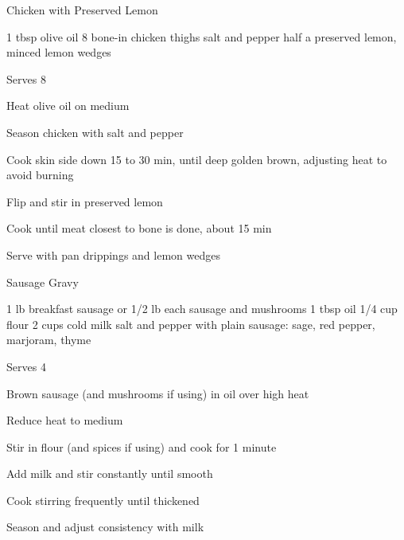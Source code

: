 
\begin{recipe}{Chicken with Preserved Lemon}{}
\begin{ingredients}
1 tbsp olive oil
8 bone-in chicken thighs
salt and pepper
half a preserved lemon, minced
lemon wedges
\end{ingredients}
\nextcolumn
Serves 8
\begin{steps}
    \item Heat olive oil on medium
    \item Season chicken with salt and pepper
    \item Cook skin side down 15 to 30 min, until deep golden brown, adjusting heat to avoid burning
    \item Flip and stir in preserved lemon
    \item Cook until meat closest to bone is done, about 15 min
    \item Serve with pan drippings and lemon wedges
\end{steps}
\end{recipe}

\begin{recipe}{Sausage Gravy}{}
\begin{ingredients}
1 lb breakfast sausage
  or
1/2 lb each sausage and mushrooms
1 tbsp oil
1/4 cup flour
2 cups cold milk
salt and pepper
with plain sausage: sage, red pepper, marjoram, thyme
\end{ingredients}
\nextcolumn
Serves 4
\begin{steps}
    \item Brown sausage (and mushrooms if using) in oil over high heat
    \item Reduce heat to medium
    \item Stir in flour (and spices if using) and cook for 1 minute
    \item Add milk and stir constantly until smooth
    \item Cook stirring frequently until thickened
    \item Season and adjust consistency with milk
\end{steps}
\end{recipe}

